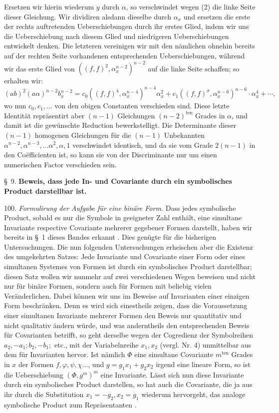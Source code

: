 Ersetzen wir hierin wiederum $y$ durch $\alpha$, so verschwindet wegen
(2) die linke Seite dieser Gleichung. Wir dividiren alsdann dieselbe
durch $\alpha_x$ und ersetzen die erste der rechts auftretenden Ueberschiebungen
durch ihr erstes Glied, indem wir uns die Ueberschiebung nach diesem
Glied und niedrigeren Ueberschiebungen entwickelt denken. Die letzteren
vereinigen wir mit den nämlichen ohnehin bereits auf der rechten
Seite vorhandenen entsprechenden Ueberschiebungen, während wir das
erste Glied von $((f,f)^2, \alpha_x^{n-2})^{n-2}$ auf die linke Seite schaffen; so erhalten
 wir:
\[
(ab)^2(a\alpha)^{n-2}b_x^{n-2} = c_0\left((f,f)^4,\alpha_x^{n-4}\right)^{n-4}\alpha_x^2 + c_1\left((f,f)^\sigma,\alpha_x^{n-6}\right)^{n-6}\cdot\alpha_x^4 + \cdots,
\]
wo nun $c_0, c_1, \ldots$ von den obigen Constanten verschieden sind. Diese
letzte Identität repräsentirt aber $(n-1)$ Gleichungen $(n-2)^{\text{ten}}$ Grades
in $\alpha$, und damit ist die gewünschte Reduction bewerkstelligt. Die
Determinante dieser $(n-1)$ homogenen Gleichungen für die $(n-1)$
Unbekannten $\alpha^{n-2}, \alpha^{n-3}, \ldots \alpha^2, \alpha, 1$ verschwindet identisch, und
da sie vom Grade $2(n-1)$ in den Co\"efficienten ist, so kann sie von
der Discriminante nur um einen numerischen Factor verschieden sein.


\S~9. \textbf{Beweis, dass jede In- und Covariante durch ein symbolisches
Product darstellbar ist.}

100. \textit{Formulirung der Aufgabe für eine binäre Form.} Dass jedes
symbolische Product, sobald es nur die Symbole in geeigneter Zahl
enthält, eine simultane Invariante respective Covariante mehrerer gegebener
 Formen darstellt, haben wir bereits in \S~1 dieses Bandes erkannt
. Dies genügte für die bisherigen Untersuchungen. Die nun
folgenden Untersuchungen erheischen aber die Existenz des umgekehrten
 Satzes: Jede Invariante und Covariante einer Form oder eines
simultanen Systemes von Formen ist durch ein symbolisches Product
darstellbar; diesen Satz wollen wir nunmehr auf zwei verschiedenen
Wegen beweisen und nicht nur für binäre Formen, sondern auch für
Formen mit beliebig vielen Veränderlichen. Dabei können wir uns
im Beweise auf Invarianten einer einzigen Form beschränken. Denn
es wird sich einestheils zeigen, dass die Voraussetzung einer simultanen
Invariante mehrerer Formen den Beweis nur quantitativ und nicht
qualitativ ändern würde, und was anderntheils den entsprechenden Beweis
 für Covarianten betrifft, so geht derselbe wegen der Cogredienz
der Symbolreihen $a_2, -a_1; b_2, -b_1;$ etc., mit der Variabelnreihe $x_1,
x_2$ (vergl. Nr. 4) unmittelbar aus dem für Invarianten hervor. Ist
nämlich $\Phi$ eine simultane Covariante $m^{\text{ten}}$ Grades in $x$ der Formen
$f, \varphi, \psi, \chi \ldots$, und $g = g_1x_1 + g_2x_2$ irgend eine lineare Form, so ist
die Ueberschiebung $(\Phi, g^m)^m$ eine Invariante. Lässt sich nun diese Invariante
 durch ein symbolisches Product darstellen, so hat auch die
Covariante, die ja aus ihr durch die Substitution $x_1 = -g_2, x_2 = g_1$
wiederum hervorgeht, das analoge symbolische Product zum Repräsentanten
.

